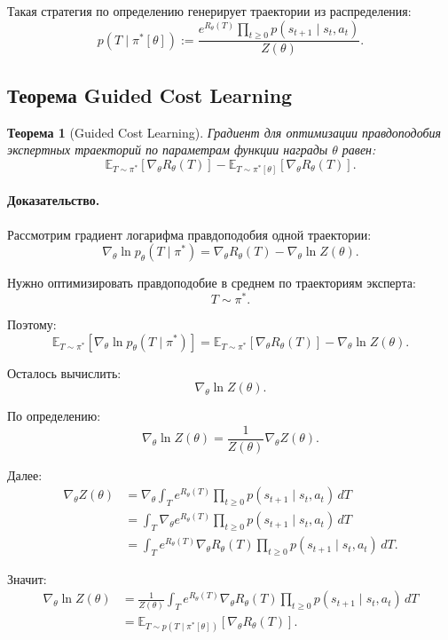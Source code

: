 \documentclass[12pt,a4paper]{article}
\newtheorem{theorem}{Теорема}
\begin{document}
Такая стратегия по определению генерирует траектории из распределения:
\[
p(T\mid\pi^\ast[\theta])
:=
\frac{
e^{R_\theta(T)}
\prod_{t\ge 0}
p(s_{t+1}\mid s_t,a_t)
}{
Z(\theta)
}.
\]

\subsection{Теорема Guided Cost Learning}

\begin{theorem}[Guided Cost Learning]
Градиент для оптимизации правдоподобия экспертных траекторий по параметрам функции награды $\theta$ равен:
\[
\mathbb E_{T\sim\pi^\ast}
\left[
\nabla_\theta R_\theta(T)
\right]
-
\mathbb E_{T\sim\pi^\ast[\theta]}
\left[
\nabla_\theta R_\theta(T)
\right].
\]
\end{theorem}

\paragraph{Доказательство.}

Рассмотрим градиент логарифма правдоподобия одной траектории:
\[
\nabla_\theta
\ln p_\theta(T\mid\pi^\ast)
=
\nabla_\theta R_\theta(T)
-
\nabla_\theta\ln Z(\theta).
\]

Нужно оптимизировать правдоподобие в среднем по траекториям эксперта:
\[
T\sim\pi^\ast.
\]

Поэтому:
\[
\mathbb E_{T\sim\pi^\ast}
\left[
\nabla_\theta
\ln p_\theta(T\mid\pi^\ast)
\right]
=
\mathbb E_{T\sim\pi^\ast}
\left[
\nabla_\theta R_\theta(T)
\right]
-
\nabla_\theta\ln Z(\theta).
\]

Осталось вычислить:
\[
\nabla_\theta\ln Z(\theta).
\]

По определению:
\[
\nabla_\theta\ln Z(\theta)
=
\frac{1}{Z(\theta)}
\nabla_\theta Z(\theta).
\]

Далее:
\[
\begin{aligned}
\nabla_\theta Z(\theta)
&=
\nabla_\theta
\int_T
e^{R_\theta(T)}
\prod_{t\ge 0}
p(s_{t+1}\mid s_t,a_t)
\,dT
\\
&=
\int_T
\nabla_\theta e^{R_\theta(T)}
\prod_{t\ge 0}
p(s_{t+1}\mid s_t,a_t)
\,dT
\\
&=
\int_T
e^{R_\theta(T)}
\nabla_\theta R_\theta(T)
\prod_{t\ge 0}
p(s_{t+1}\mid s_t,a_t)
\,dT.
\end{aligned}
\]

Значит:
\[
\begin{aligned}
\nabla_\theta\ln Z(\theta)
&=
\frac{1}{Z(\theta)}
\int_T
e^{R_\theta(T)}
\nabla_\theta R_\theta(T)
\prod_{t\ge 0}
p(s_{t+1}\mid s_t,a_t)
\,dT
\\
&=
\mathbb E_{T\sim p(T\mid\pi^\ast[\theta])}
\left[
\nabla_\theta R_\theta(T)
\right].
\end{aligned}
\]
\end{document}
